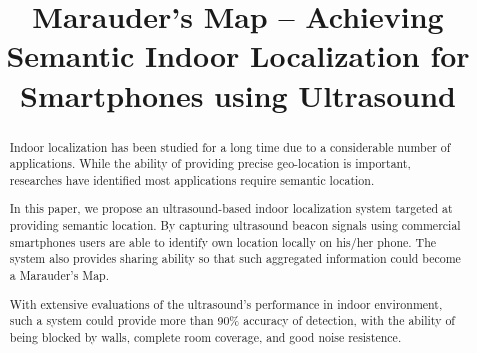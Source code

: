 \documentclass[conference, 10pt]{IEEEtran}
\begin{document}
\title{Marauder's Map -- Achieving Semantic Indoor Localization for Smartphones using Ultrasound}

\author{
\and
{}
\and
{}
}

\maketitle

\begin{abstract}
Indoor localization has been studied for a long time due to a considerable number of applications. While the ability of providing precise geo-location is important, researches have identified most applications require semantic location.

In this paper, we propose an ultrasound-based indoor localization system targeted at providing semantic location. By capturing ultrasound beacon signals using commercial smartphones users are able to identify own location locally on his/her phone. The system also provides sharing ability so that such aggregated information could become a Marauder's Map. 

With extensive evaluations of the ultrasound's performance in indoor environment, such a system could  provide more than 90\% accuracy of detection, with the ability of being blocked by walls, complete room coverage, and good noise resistence. 
\end{abstract}








\end{document}
